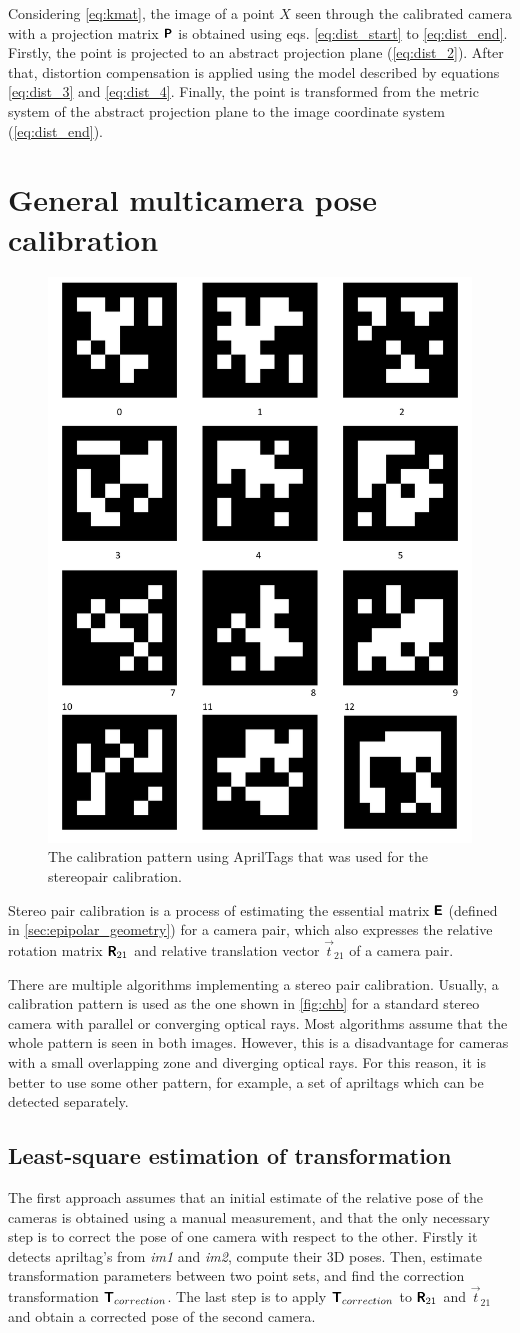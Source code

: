 Considering \autoref{eq:kmat}, the image of a point $X$ seen through the calibrated camera with a projection matrix $\pmb{\mathsf{P}}$ is obtained using eqs. \eqref{eq:dist_start} to \eqref{eq:dist_end}. 
Firstly, the point is projected to an abstract projection plane (\autoref{eq:dist_2}). 
After that, distortion compensation is applied using the model described by equations \eqref{eq:dist_3} and \eqref{eq:dist_4}. 
Finally, the point is transformed from the metric system of the abstract projection plane to the image coordinate system (\autoref{eq:dist_end}).

\section{General multicamera pose calibration}
\label{sec:stereocalib}

\begin{figure}[h]
    \centering
    \includegraphics[width=.2\textwidth]{graphics/aptags.png}
    \caption{The calibration pattern using AprilTags \cite{Wang2016} that was used for the stereopair calibration.}
    \label{fig:aptags}
\end{figure}

Stereo pair calibration is a process of estimating the essential matrix $\pmb{\mathsf{E}}$ (defined in \autoref{sec:epipolar_geometry}) for a camera pair, which also expresses the relative rotation matrix $\pmb{\mathsf{R}}_{21}$ and relative translation vector $\vec{t}_{21}$ of a camera pair. 

There are multiple algorithms implementing a stereo pair calibration.
Usually, a calibration pattern is used as the one shown in \autoref{fig:chb} for a standard stereo camera with parallel or converging optical rays.
Most algorithms assume that the whole pattern is seen in both images.
However, this is a disadvantage for cameras with a small overlapping zone and diverging optical rays.
For this reason, it is better to use some other pattern, for example, a set of apriltags \cite{Malyuta2019} which can be detected separately. 

\subsection{Least-square estimation of transformation}
\label{sec:lsq_umeyama}
The first approach assumes that an initial estimate of the relative pose of the cameras is obtained using a manual measurement, and that the only necessary step is to correct the pose of one camera with respect to the other.
Firstly it detects apriltag's from \textit{im1} and \textit{im2}, compute their 3D poses.
Then, estimate transformation parameters between two point sets, and find the correction transformation $\pmb{\mathsf{T}}_{correction}$.
The last step is to apply $\pmb{\mathsf{T}}_{correction}$ to $\pmb{\mathsf{R}}_{21}$ and $\vec{t}_{21}$ and obtain a corrected pose of the second camera.

